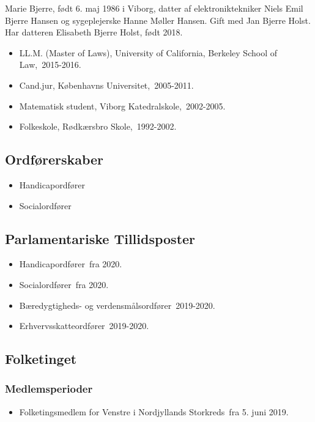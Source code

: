 \documentclass[11pt, a4paper]{awesome-cv}
\begin{document}
\makecvheader[R]
\makelettertitle
\begin{cvletter}
Marie Bjerre, født 6. maj 1986 i Viborg, datter af elektroniktekniker Niels Emil Bjerre Hansen og sygeplejerske Hanne Møller Hansen. Gift med Jan Bjerre Holst. Har datteren Elisabeth Bjerre Holst, født 2018.

\begin{itemize}
\item LL.M. (Master of Laws), University of California, Berkeley School of Law, 2015-2016.
\item Cand.jur, Københavns Universitet, 2005-2011.
\item Matematisk student, Viborg Katedralskole, 2002-2005.
\item Folkeskole, Rødkærsbro Skole, 1992-2002.
\end{itemize}
\subsection*{Ordførerskaber}
\begin{itemize}
\item Handicapordfører
\item Socialordfører
\end{itemize}
\subsection*{Parlamentariske Tillidsposter}
\begin{itemize}
\item Handicapordfører fra 2020.
\item Socialordfører fra 2020.
\item Bæredygtigheds- og verdensmålsordfører 2019-2020.
\item Erhvervsskatteordfører 2019-2020.
\end{itemize}
\subsection*{Folketinget}
\subsubsection*{Medlemsperioder}
\begin{itemize}
\item Folketingsmedlem for Venstre i Nordjyllands Storkreds fra 5. juni 2019.
\end{itemize}

\end{cvletter}
\end{document}
